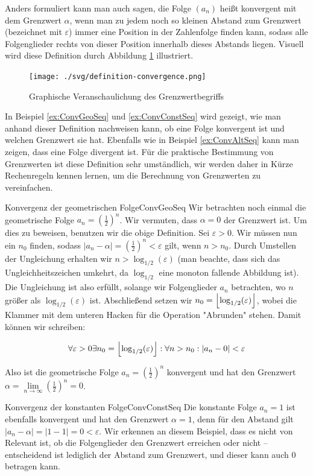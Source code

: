 Anders formuliert kann man auch sagen, die Folge $(a_n)$ heißt konvergent mit dem Grenzwert $\alpha$, wenn man zu jedem noch so kleinen Abstand zum Grenzwert (bezeichnet mit $\varepsilon$) immer eine Position in der Zahlenfolge finden kann, sodass alle Folgenglieder rechts von dieser Position innerhalb dieses Abstands liegen. Visuell wird diese Definition durch Abbildung \ref{fig:VisLimit} illustriert.

\begin{figure}
	\centering
	\texttt{[image: ./svg/definition-convergence.png]}
	\caption{Graphische Veranschaulichung des Grenzwertbegriffs}
	\label{fig:VisLimit}
\end{figure}

In Beispiel \ref{ex:ConvGeoSeq} und \ref{ex:ConvConstSeq} wird gezeigt, wie man anhand dieser Definition nachweisen kann, ob eine Folge konvergent ist und welchen Grenzwert sie hat. Ebenfalls wie in Beispiel \ref{ex:ConvAltSeq} kann man zeigen, dass eine Folge divergent ist. Für die praktische Bestimmung von Grenzwerten ist diese Definition sehr umständlich, wir werden daher in Kürze Rechenregeln kennen lernen, um die Berechnung von Grenzwerten zu vereinfachen.

\begin{example}{Konvergenz der geometrischen Folge}{ConvGeoSeq}
	Wir betrachten noch einmal die geometrische Folge $a_n = (\frac{1}{2})^n$. Wir vermuten, dass $\alpha=0$ der Grenzwert ist. Um dies zu beweisen, benutzen wir die obige Definition. Sei $\varepsilon>0$. Wir müssen
	nun ein $n_0$ finden, sodass $|a_n-\alpha|=(\frac{1}{2})^n < \varepsilon$ gilt, wenn $n > n_0$. Durch Umstellen der Ungleichung erhalten wir $n > \log_{1/2}(\varepsilon)$ (man beachte, dass sich das Ungleichheitszeichen umkehrt, da $\log_{1/2}$ eine monoton fallende Abbildung ist). Die Ungleichung ist also erfüllt, solange wir Folgenglieder $a_n$ betrachten, wo $n$ größer als $\log_{1/2}(\varepsilon)$ ist. Abschließend setzen wir $n_0 = \left\lfloor \log_{1/2}(\varepsilon) \right\rfloor$, wobei die Klammer mit dem unteren Hacken für die Operation "Abrunden" stehen. Damit können wir schreiben:

	$$
	\forall \varepsilon > 0 \exists n_0 = \left\lfloor \log_{1/2}(\varepsilon) \right\rfloor : \forall n > n_0 : |a_n - 0| < \varepsilon
	$$

	Also ist die geometrische Folge $a_n = (\frac{1}{2})^n$ konvergent und hat den Grenzwert $\alpha=\lim\limits_{n\to\infty}(\frac{1}{2})^n=0$.
\end{example}


\begin{example}{Konvergenz der konstanten Folge}{ConvConstSeq}
	Die konstante Folge $a_n = 1$ ist ebenfalls konvergent und hat den Grenzwert $\alpha = 1$, denn für den Abstand gilt $|a_n-\alpha|=|1-1|=0<\varepsilon$. Wir erkennen an diesem Beispiel, dass es nicht von Relevant ist, ob die Folgenglieder den Grenzwert erreichen oder nicht -- entscheidend ist lediglich der Abstand zum Grenzwert, und dieser kann auch $0$ betragen kann.
\end{example}


